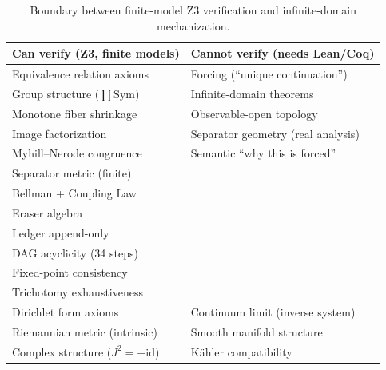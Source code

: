 \begin{table}[h!]
\centering
\small
\begin{tabular}{@{}ll@{}}
\toprule
\textbf{Can verify (Z3, finite models)} & \textbf{Cannot verify (needs Lean/Coq)} \\
\midrule
Equivalence relation axioms & Forcing (``unique continuation'') \\
Group structure ($\prod \mathrm{Sym}$) & Infinite-domain theorems \\
Monotone fiber shrinkage & Observable-open topology \\
Image factorization & Separator geometry (real analysis) \\
Myhill--Nerode congruence & Semantic ``why this is forced'' \\
Separator metric (finite) & \\
Bellman + Coupling Law & \\
Eraser algebra & \\
Ledger append-only & \\
DAG acyclicity (34 steps) & \\
Fixed-point consistency & \\
Trichotomy exhaustiveness & \\
Dirichlet form axioms & Continuum limit (inverse system) \\
Riemannian metric (intrinsic) & Smooth manifold structure \\
Complex structure ($J^2=-\mathrm{id}$) & K\"ahler compatibility \\
\bottomrule
\end{tabular}
\caption{Boundary between finite-model Z3 verification and infinite-domain mechanization.}
\label{tab:z3-boundary}
\end{table}
